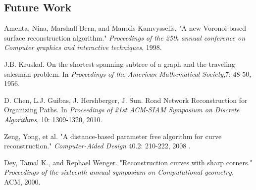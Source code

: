 \documentclass[11pt]{article}
\begin{document}
\subsection{Future Work}


\begin{thebibliography}{50}


Amenta, Nina, Marshall Bern, and Manolis Kamvysselis. 
"A new Voronoi-based surface reconstruction algorithm." 
\textit{Proceedings of the 25th annual conference on Computer graphics and interactive techniques}, 1998.

J.B. Kruskal.
On the shortest spanning subtree of a graph and the traveling salesman problem.
In \emph{Proceedings of the American Mathematical Society},7: 48-50, 1956.

D. Chen, L.J. Guibas, J. Hershberger, J. Sun.
Road Network Reconstruction for Organizing Paths.
In \emph{Proceedings  of  21st  ACM-SIAM  Symposium  on  Discrete  Algorithms}, 10: 1309-1320, 2010.

Zeng, Yong, et al. "A distance-based parameter free algorithm for curve reconstruction." \textit{Computer-Aided Design} 40.2: 210-222, 2008 .

Dey, Tamal K., and Rephael Wenger. "Reconstruction curves with sharp corners." \textit{Proceedings of the sixteenth annual symposium on Computational geometry.} ACM, 2000.




\end{thebibliography}
\end{document}
